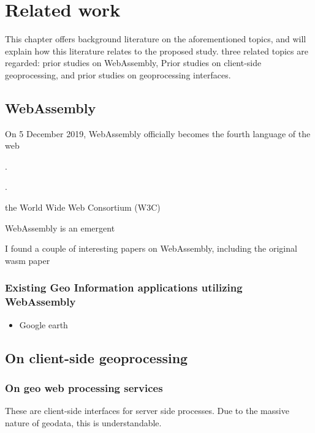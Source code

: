 \newpage

\section{Related work}

This chapter offers background literature on the aforementioned topics, and will explain how this literature relates to the proposed study. three related topics are regarded: prior studies on WebAssembly, Prior studies on client-side geoprocessing, and prior studies on geoprocessing interfaces.


\subsection{WebAssembly}

On 5 December 2019, WebAssembly officially becomes the fourth language of the web 

\cite{haas_bringing_2017}.

\cite{w3c_world_2019}.


the World Wide Web Consortium (W3C) 


WebAssembly is an emergent 

I found a couple of interesting papers on WebAssembly, including the original wasm paper



\subsubsection*{Existing Geo Information applications utilizing WebAssembly}

\begin{itemize}
  \item Google earth
\end{itemize}



\subsection{On client-side geoprocessing}





\subsubsection*{On geo web processing services}
These are client-side interfaces for server side processes. 
Due to the massive nature of geodata, this is understandable.







